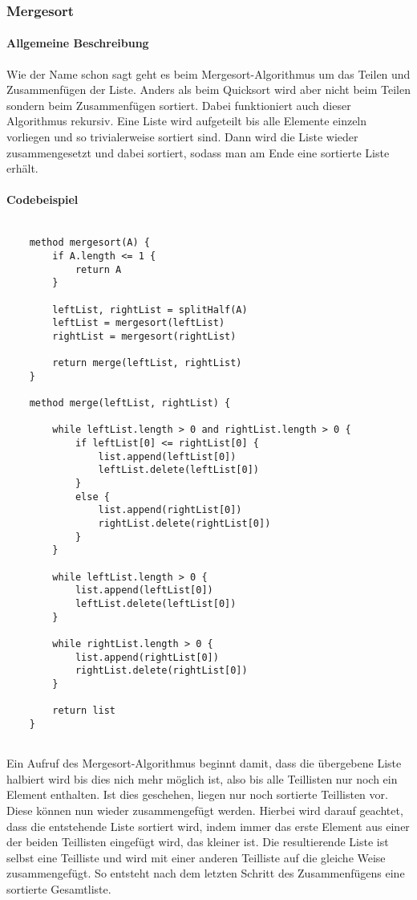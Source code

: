 \documentclass{article}
\begin{document}
	\subsubsection{Mergesort}
	
	\paragraph{Allgemeine Beschreibung}
	
	Wie der Name schon sagt geht es beim Mergesort-Algorithmus um das Teilen und Zusammenfügen der Liste. Anders als beim Quicksort wird aber nicht beim Teilen sondern beim Zusammenfügen sortiert. Dabei funktioniert auch dieser Algorithmus rekursiv. Eine Liste wird aufgeteilt bis alle Elemente einzeln vorliegen und so trivialerweise sortiert sind. Dann wird die Liste wieder zusammengesetzt und dabei sortiert, sodass man am Ende eine sortierte Liste erhält.
	
	\paragraph{Codebeispiel}
	
	\begin{lstlisting}[caption=Der Mergesort-Algorithmus in einfachem Pseudocode]
	
	method mergesort(A) {
		if A.length <= 1 {
			return A		
		}
		
		leftList, rightList = splitHalf(A)
		leftList = mergesort(leftList)
		rightList = mergesort(rightList)
		
		return merge(leftList, rightList)
	}
	
	method merge(leftList, rightList) {
		
		while leftList.length > 0 and rightList.length > 0 {
			if leftList[0] <= rightList[0] {
				list.append(leftList[0])
				leftList.delete(leftList[0])			
			}
			else {
				list.append(rightList[0])
				rightList.delete(rightList[0])			
			}
		}
		
		while leftList.length > 0 {
			list.append(leftList[0])
			leftList.delete(leftList[0])		
		}
		
		while rightList.length > 0 {
			list.append(rightList[0])
			rightList.delete(rightList[0])
		}
		
		return list
	}
	
	\end{lstlisting}
	
	Ein Aufruf des Mergesort-Algorithmus beginnt damit, dass die übergebene Liste halbiert wird bis dies nich mehr möglich ist, also bis alle Teillisten nur noch ein Element enthalten. Ist dies geschehen, liegen nur noch sortierte Teillisten vor. Diese können nun wieder zusammengefügt werden. Hierbei wird darauf geachtet, dass die entstehende Liste sortiert wird, indem immer das erste Element aus einer der beiden Teillisten eingefügt wird, das kleiner ist. Die resultierende Liste ist selbst eine Teilliste und wird mit einer anderen Teilliste auf die gleiche Weise zusammengefügt. So entsteht nach dem letzten Schritt des Zusammenfügens eine sortierte Gesamtliste.
	
\end{document}
